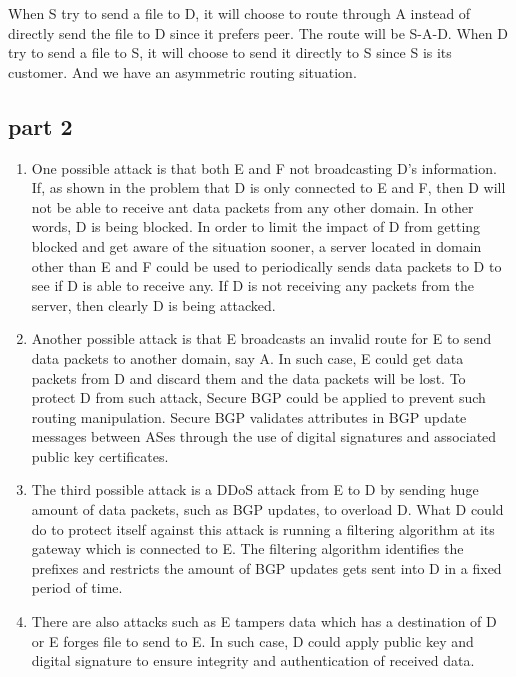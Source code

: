 When S try to send a file to D, it will choose to route through A instead of directly send the file to D since it prefers peer. The route will be S-A-D. When D try to send a file to S, it will choose to send it directly to S since S is its customer. And we have an asymmetric routing situation.

\subsection{part 2}

\begin{enumerate}
\item One possible attack is that both E and F not broadcasting D's information. If, as shown in the problem that D is only connected to E and F, then D will not be able to receive ant data packets from any other domain. In other words, D is being blocked. In order to limit the impact of D from getting blocked and get aware of the situation sooner, a server located in domain other than E and F could be used to periodically sends data packets to D to see if D is able to receive any. If D is not receiving any packets from the server, then clearly D is being attacked.
\item Another possible attack is that E broadcasts an invalid route for E to send data packets to another domain, say A. In such case, E could get data packets from D and discard them and the data packets will be lost. To protect D from such attack, Secure BGP could be applied to prevent such routing manipulation. Secure BGP validates attributes in BGP update messages between ASes through the use of digital signatures and associated public key certificates.
\item The third possible attack is a DDoS attack from E to D by sending huge amount of data packets, such as BGP updates, to overload D. What D could do to protect itself against this attack is running a filtering algorithm at its gateway which is connected to E. The filtering algorithm identifies the prefixes and restricts the amount of BGP updates gets sent into D in a fixed period of time.
\item There are also attacks such as E tampers data which has a destination of D or E forges file to send to E. In such case, D could apply public key and digital signature to ensure integrity and authentication of received data.
\end{enumerate}
